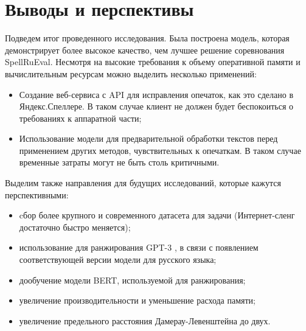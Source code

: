 \chapter{Выводы и перспективы}

Подведем итог проведенного исследования. Была построена модель, которая демонстрирует более высокое качество, чем лучшее решение соревнования SpellRuEval. Несмотря на высокие требования к объему оперативной памяти и вычислительным ресурсам можно выделить несколько применений:
\begin{itemize}
	\item Создание веб-сервиса с API для исправления опечаток, как это сделано в Яндекс.Спеллере. В таком случае клиент не должен будет беспокоиться о требованиях к аппаратной части;
	\item Использование модели для предварительной обработки текстов перед применением других методов, чувствительных к опечаткам. В таком случае временные затраты могут не быть столь критичными.
\end{itemize}

Выделим также направления для будущих исследований, которые кажутся перспективными:
\begin{itemize}
	\item cбор более крупного и современного датасета для задачи (Интернет-сленг достаточно быстро меняется);
	\item использование для ранжирования GPT-3 \cite{Brown2020}, в связи с появлением соответствующей версии модели для русского языка;
	\item дообучение модели BERT, используемой для ранжирования;
	\item увеличение производительности и уменьшение расхода памяти;
	\item увеличение предельного расстояния Дамерау-Левенштейна до двух.
\end{itemize}
